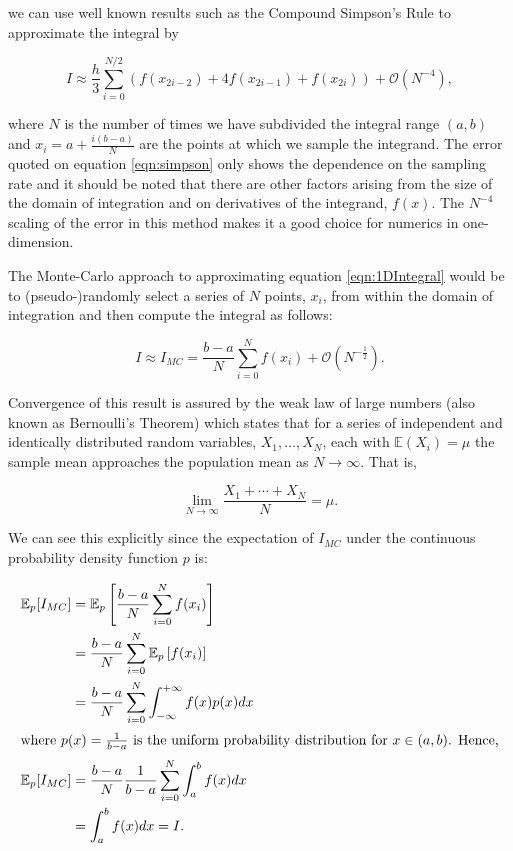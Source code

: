 	we can use well known results such as the Compound Simpson's Rule to approximate the integral by

	\begin{equation}
		I \approx \frac{h}{3}\sum_{i=0}^{N/2}\left(f(x_{2i-2}) + 4f(x_{2i-1}) + f(x_{2i})\right) + \mathcal{O}(N^{-4}),
		\label{eqn:simpson}
	\end{equation}

	where $N$ is the number of times we have subdivided the integral range $(a, b)$ and $x_i = a + \frac{i(b-a)}{N}$ are the points at which we sample the integrand.
	The error quoted on equation \ref{eqn:simpson} only shows the dependence on the sampling rate and it should be noted that there are other factors arising
	from the size of the domain of integration and on derivatives of the integrand, $f(x)$.  The $N^{-4}$ scaling of the error in this method makes it a good choice
	for numerics in one-dimension.

	The Monte-Carlo approach to approximating equation \eqref{eqn:1DIntegral} would be to (pseudo-)randomly select a series of $N$ points, $x_i$, from within the domain of integration
	and then compute the integral as follows:

	\begin{equation}
		I \approx I_{MC} = \frac{b-a}{N}\sum_{i=0}^{N}f(x_i) + \mathcal{O}(N^{-\frac{1}{2}}).
	\end{equation}

	Convergence of this result is assured by the weak law of large numbers (also known as Bernoulli's Theorem) which states that for a series of
	independent and identically distributed random variables, ${X_1,\ldots,X_N}$, each with $\mathbb{E}(X_i) = \mu$ the sample mean approaches the population mean as $N\rightarrow\infty$.
	That is,

	\begin{equation}
		\lim_{N\rightarrow\infty}\frac{X_1+\cdots+X_N}{N}=\mu.
	\end{equation}

	We can see this explicitly since the expectation of $I_{MC}$ under the continuous probability density function $p$ is:

	\begin{align*}
		\mathbb{E}_p[I_{MC}] &= \mathbb{E}_p\left[\frac{b-a}{N}\sum_{i=0}^{N}f(x_i)\right]    \\
		                     &= \frac{b-a}{N}\sum_{i=0}^{N}\mathbb{E}_p\left[f(x_i)\right]    \\
		                     &= \frac{b-a}{N}\sum_{i=0}^{N}\int_{-\infty}^{+\infty}f(x)p(x)dx \\
		                     \intertext{where $p(x)=\frac{1}{b-a}$ is the uniform probability distribution for $x\in(a, b)$.  Hence,}
		\mathbb{E}_p[I_{MC}] &= \frac{b-a}{N}\frac{1}{b-a}\sum_{i=0}^{N}\int_{a}^{b}f(x)dx \\
		                     &= \int_{a}^{b}f(x)dx = I.
	\end{align*}

